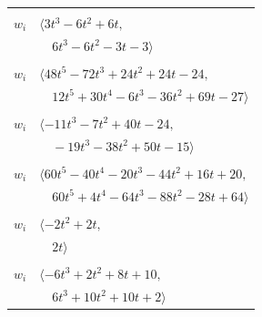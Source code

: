 \documentclass[11pt]{article}
\begin{document}
\begin{longtable}{@{}ll@{}}
\addlinespace[2pt]
\multicolumn{2}{@{}p{0.97\textwidth}@{}}{$i=19$, $D_i=1$, $\rho_{ij}$: $5{:}2, \allowbreak 6{:}1, \allowbreak 7{:}1, \allowbreak 8{:}1, \allowbreak 12{:}2, \allowbreak 16{:}1, \allowbreak 20{:}2$}\\
$w_i$ & $\langle 3t^{3}-6t^{2}+6t,$\\
 & $\quad 6t^{3}-6t^{2}-3t-3\rangle$\\
\addlinespace[2pt]
\multicolumn{2}{@{}p{0.97\textwidth}@{}}{$i=20$, $D_i=8$, $\rho_{ij}$: $0{:}2, \allowbreak 1{:}1, \allowbreak 7{:}2, \allowbreak 8{:}2, \allowbreak 10{:}1, \allowbreak 17{:}2, \allowbreak 18{:}1, \allowbreak 19{:}1, \allowbreak 22{:}2, \allowbreak 27{:}1$}\\
$w_i$ & $\langle 48t^{5}-72t^{3}+24t^{2}+24t-24,$\\
 & $\quad 12t^{5}+30t^{4}-6t^{3}-36t^{2}+69t-27\rangle$\\
\addlinespace[2pt]
\multicolumn{2}{@{}p{0.97\textwidth}@{}}{$i=21$, $D_i=8$, $\rho_{ij}$: $1{:}2, \allowbreak 2{:}1, \allowbreak 10{:}1, \allowbreak 12{:}1, \allowbreak 14{:}1, \allowbreak 15{:}2, \allowbreak 18{:}2, \allowbreak 22{:}1, \allowbreak 23{:}2, \allowbreak 25{:}1$}\\
$w_i$ & $\langle -11t^{3}-7t^{2}+40t-24,$\\
 & $\quad -19t^{3}-38t^{2}+50t-15\rangle$\\
\addlinespace[2pt]
\multicolumn{2}{@{}p{0.97\textwidth}@{}}{$i=22$, $D_i=22$, $\rho_{ij}$: $1{:}1, \allowbreak 4{:}2, \allowbreak 7{:}2, \allowbreak 15{:}2, \allowbreak 20{:}1, \allowbreak 21{:}2$}\\
$w_i$ & $\langle 60t^{5}-40t^{4}-20t^{3}-44t^{2}+16t+20,$\\
 & $\quad 60t^{5}+4t^{4}-64t^{3}-88t^{2}-28t+64\rangle$\\
\addlinespace[2pt]
\multicolumn{2}{@{}p{0.97\textwidth}@{}}{$i=23$, $D_i=1$, $\rho_{ij}$: $6{:}2, \allowbreak 8{:}1, \allowbreak 12{:}1, \allowbreak 21{:}1, \allowbreak 24{:}1$}\\
$w_i$ & $\langle -2t^{2}+2t,$\\
 & $\quad 2t\rangle$\\
\addlinespace[2pt]
\multicolumn{2}{@{}p{0.97\textwidth}@{}}{$i=24$, $D_i=2$, $\rho_{ij}$: $3{:}2, \allowbreak 4{:}1, \allowbreak 8{:}1, \allowbreak 14{:}1, \allowbreak 15{:}1, \allowbreak 23{:}2, \allowbreak 25{:}2$}\\
$w_i$ & $\langle -6t^{3}+2t^{2}+8t+10,$\\
 & $\quad 6t^{3}+10t^{2}+10t+2\rangle$\\

\end{longtable}
\end{document}
